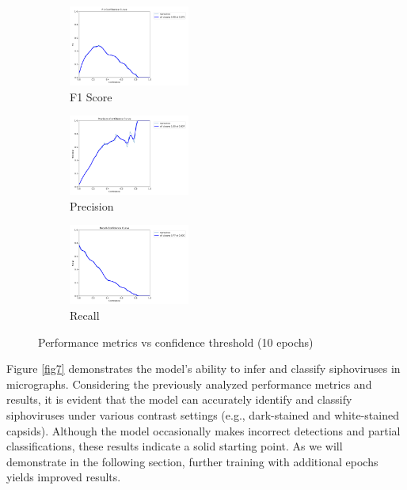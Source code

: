 \documentclass[runningheads]{llncs}
\begin{document}
\begin{figure}[H]
    
    \begin{subfigure}[b]{0.25\textwidth}
        \begin{center}
        \includegraphics[height = 100px]{./figures/fig6a10e_f1_curve.png}
        \caption{F1 Score}
        \end{center}
    \end{subfigure}
    \hfill
    \begin{subfigure}[b]{0.25\textwidth}
    \begin{center}
        \includegraphics[height = 100px]{./figures/fig6b10e_P_curve.png}
        \caption{Precision}
        \end{center}
    \end{subfigure}
    \hfill
    \begin{subfigure}[b]{0.25\textwidth}
    \begin{center}
        \includegraphics[height = 100px]{./figures/fig6c_10_eR_curve.png}
        \caption{Recall}
        \end{center}
    \end{subfigure}
    \caption{Performance metrics vs confidence threshold (10 epochs)}
    \label{fig6}
\end{figure}

Figure \ref{fig7} demonstrates the model's ability to infer and classify siphoviruses in micrographs. Considering the previously analyzed performance metrics and results, it is evident that the model can accurately identify and classify siphoviruses under various contrast settings (e.g., dark-stained and white-stained capsids). Although the model occasionally makes incorrect detections and partial classifications, these results indicate a solid starting point. As we will demonstrate in the following section, further training with additional epochs yields improved results.
\end{document}

